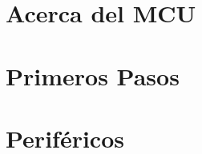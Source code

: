 \documentclass[12pt,letterpaper]{article}
\begin{document}
\pagebreak


\tableofcontents

\section{Acerca del MCU}
    
\section{Primeros Pasos}
    
\section{Periféricos}
    
    
   \newpage
    
%    



%






\end{document}
